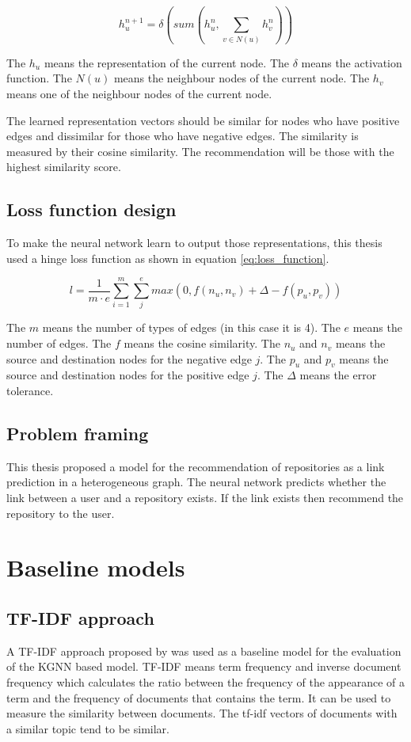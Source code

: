 \documentclass[11pt,twoside]{report}
\begin{document}
\begin{equation}
    h_u^{n+1}=\delta(sum(h_u^n, \sum_{v\in{N(u)}}h_v^n))
    \label{eq:message_passing_aggregation}
\end{equation}

The $h_u$ means the representation of the current node. The $\delta$ means the activation function. The $N(u)$ means the neighbour nodes of the current node. The $h_v$ means one of the neighbour nodes of the current node.

The learned representation vectors should be similar for nodes who have positive edges and dissimilar for those who have negative edges. The similarity is measured by their cosine similarity. The recommendation will be those with the highest similarity score.

\subsection{Loss function design}
To make the neural network learn to output those representations, this thesis used a hinge loss function as shown in equation \ref{eq:loss_function}.

\begin{equation}
    l=\frac{1}{m\cdot{e}}\sum_{i=1}^{m}\sum_{j}^{e} max(0, f(n_u, n_v)+\Delta-f(p_u, p_v))
    \label{eq:loss_function}
\end{equation}

The $m$ means the number of types of edges (in this case it is 4). The $e$ means the number of edges. The $f$ means the cosine similarity. The $n_u$ and $n_v$ means the source and destination nodes for the negative edge $j$. The $p_u$ and $p_v$ means the source and destination nodes for the positive edge $j$. The $\Delta$ means the error tolerance.

\subsection{Problem framing}
This thesis proposed a model for the recommendation of repositories as a link prediction in a heterogeneous graph. The neural network predicts whether the link between a user and a repository exists. If the link exists then recommend the repository to the user.

\section{Baseline models}
\subsection{TF-IDF approach}
A TF-IDF approach proposed by \cite{sun_personalized_2018} was used as a baseline model for the evaluation of the KGNN based model. TF-IDF means term frequency and inverse document frequency which calculates the ratio between the frequency of the appearance of a term and the frequency of documents that contains the term. It can be used to measure the similarity between documents. The tf-idf vectors of documents with a similar topic tend to be similar.
\end{document}
